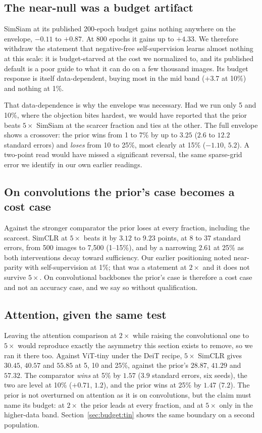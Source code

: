 \subsection{The near-null was a budget artifact}\label{sec:budget:simsiam}
SimSiam at its published 200-epoch budget gains nothing anywhere on the
envelope, $-0.11$ to $+0.87$. At 800 epochs it gains up to $+4.33$. We
therefore withdraw the statement that negative-free self-supervision learns
almost nothing at this scale: it is budget-starved at the cost we
normalized to, and its published default is a poor guide to what it can do
on a few thousand images. Its budget response is itself data-dependent,
 buying most in the mid band ($+3.7$ at 10\%) and nothing at 1\%.

That data-dependence is why the envelope was necessary. Had we run only 5 and
10\%, where the objection bites hardest, we would have reported that the prior
beats $5\times$ SimSiam at the scarcer fraction and ties at the other. The full
envelope shows a crossover: the prior wins from 1 to 7\% by up to $3.25$ ($2.6$
to $12.2$ standard errors) and \emph{loses} from 10 to 25\%, most clearly at
15\% ($-1.10$, $5.2$). A two-point read would have missed a significant
reversal, the same sparse-grid error we identify in our own earlier readings.

\subsection{On convolutions the prior's case becomes a cost
case}\label{sec:budget:conv}
Against the stronger comparator the prior loses at every fraction, including
the scarcest. SimCLR at $5\times$ beats it by $3.12$ to $9.23$ points, at 8
to 37 standard errors, from 500 images to 7{,}500 (1--15\%), and by a
narrowing $2.61$ at 25\% as both interventions decay toward
sufficiency. Our earlier positioning
noted near-parity with self-supervision at 1\%; that was a statement at
$2\times$ and it does not survive $5\times$. On convolutional backbones the
prior's case is therefore a cost case and not an accuracy case, and we say
so without qualification.

\subsection{Attention, given the same test}\label{sec:budget:vit}
Leaving the attention comparison at $2\times$ while raising the
convolutional one to $5\times$ would reproduce exactly the asymmetry this
section exists to remove, so we ran it there too. Against ViT-tiny under the
DeiT recipe, $5\times$ SimCLR gives $30.45$, $40.57$ and $55.85$ at 5, 10
and 25\%, against the prior's $28.87$, $41.29$ and $57.32$. The comparator
\emph{wins} at 5\% by $1.57$ ($3.9$ standard errors, six seeds), the two
are level at 10\% ($+0.71$, $1.2$), and the prior wins at 25\% by $1.47$
($7.2$). The
prior is not overturned on attention as it is on convolutions, but the claim must name its budget: at $2\times$ the prior leads at
every fraction, and at $5\times$ only in the higher-data band.
Section~\ref{sec:budget:tin} shows the same boundary on a second
population.

